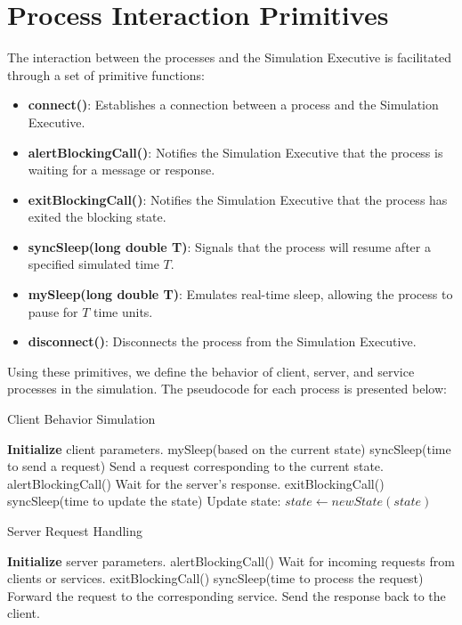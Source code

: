 \section{Process Interaction Primitives}

The interaction between the processes and the Simulation Executive is facilitated through a set of primitive functions:

\begin{itemize}
    \item \textbf{connect()}: Establishes a connection between a process and the Simulation Executive.
    \item \textbf{alertBlockingCall()}: Notifies the Simulation Executive that the process is waiting for a message or response.
    \item \textbf{exitBlockingCall()}: Notifies the Simulation Executive that the process has exited the blocking state.
    \item \textbf{syncSleep(long double T)}: Signals that the process will resume after a specified simulated time \( T \).
    \item \textbf{mySleep(long double T)}: Emulates real-time sleep, allowing the process to pause for \( T \) time units.
    \item \textbf{disconnect()}: Disconnects the process from the Simulation Executive.
\end{itemize}

Using these primitives, we define the behavior of client, server, and service processes in the simulation. The pseudocode for each process is presented below:

\begin{algorithm}[H]
\caption{Client Behavior Simulation} \label{alg:client_simulation}
\begin{algorithmic}[1]
    \STATE \textbf{Initialize} client parameters.
        \STATE mySleep(based on the current state)
        \STATE syncSleep(time to send a request)
        \STATE Send a request corresponding to the current state.
        \STATE alertBlockingCall()
        \STATE Wait for the server's response.
        \STATE exitBlockingCall()
        \STATE syncSleep(time to update the state)
        \STATE Update state: $state \leftarrow newState(state)$
    \ENDWHILE
\end{algorithmic}
\end{algorithm}

\begin{algorithm}[H]
\caption{Server Request Handling} \label{alg:server_request_handling}
\begin{algorithmic}[1]
    \STATE \textbf{Initialize} server parameters.
        \STATE alertBlockingCall()
        \STATE Wait for incoming requests from clients or services.
        \STATE exitBlockingCall()
        \STATE syncSleep(time to process the request)
            \STATE Forward the request to the corresponding service.
        \ELSE
            \STATE Send the response back to the client.
        \ENDIF
    \ENDWHILE
\end{algorithmic}
\end{algorithm}

